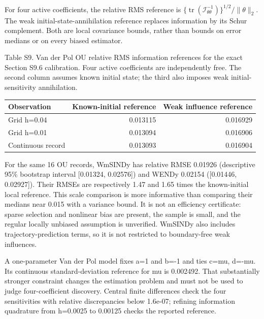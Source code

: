 \documentclass[
  american,
  11pt,
]{article}
\begin{document}
For four active coefficients, the relative RMS reference is
\(\{\operatorname{tr}(\mathcal I_{\theta\theta}^{-1})\}^{1/2}/\|\theta\|_2\).
The weak initial-state-annihilation reference replaces information by
its Schur complement. Both are local covariance bounds, rather than
bounds on error medians or on every biased estimator.

\begin{center}
\begin{minipage}{\linewidth}
Table S9. Van der Pol OU relative RMS information references for the
exact Section S9.6 calibration. Four active coefficients are
independently free. The second column assumes known initial state; the
third also imposes weak initial-sensitivity annihilation.

\small\setlength{\tabcolsep}{3pt}
\begin{tabular}{@{}lrr@{}}
\toprule\noalign{}
Observation & Known-initial reference & Weak influence reference \\
\midrule\noalign{}
Grid h=0.04 & 0.013115 & 0.016929 \\
Grid h=0.01 & 0.013094 & 0.016906 \\
Continuous record & 0.013093 & 0.016904 \\
\bottomrule
\end{tabular}
\end{minipage}
\end{center}

For the same 16 OU records, WmSINDy has relative RMSE 0.01926
(descriptive 95\% bootstrap interval {[}0.01324, 0.02576{]}) and WENDy
0.02154 ({[}0.01446, 0.02927{]}). Their RMSEs are respectively 1.47 and
1.65 times the known-initial local reference. This scale comparison is
more informative than comparing their medians near 0.015 with a variance
bound. It is not an efficiency certificate: sparse selection and
nonlinear bias are present, the sample is small, and the regular locally
unbiased assumption is unverified. WmSINDy also includes
trajectory-prediction terms, so it is not restricted to boundary-free
weak influences.

A one-parameter Van der Pol model fixes a=1 and b=-1 and ties c=mu,
d=-mu. Its continuous standard-deviation reference for mu is 0.002492.
That substantially stronger constraint changes the estimation problem
and must not be used to judge four-coefficient discovery. Central finite
differences check the four sensitivities with relative discrepancies
below 1.6e-07; refining information quadrature from h=0.0025 to 0.00125
checks the reported reference.
\end{document}

